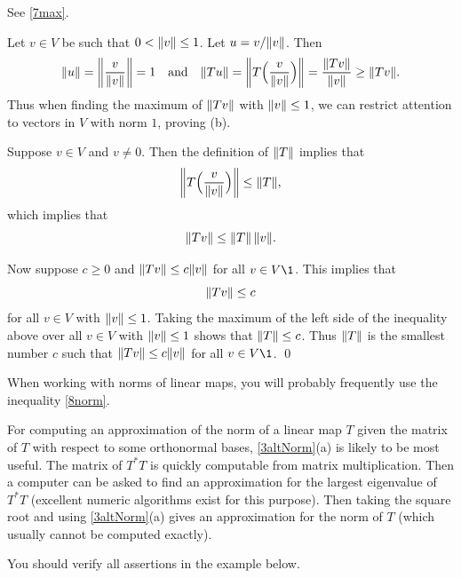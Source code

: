 \proof
\begin{subtheorem}
\item
See \ref{7max}.

\item
Let $v \in V$ be such that $0 < \lVert v\rVert \le 1$. Let $u = v/\lVert v\rVert$. Then
\[
\norm{u} = \norm[\bigg]{ \frac{v}{\norm{v}} } = 1 \andd \norm{Tu} =\norm[\bigg]{ T\paren[\Big]{ \frac{v}{\norm{v}} } } = \frac{\norm{Tv}}{\norm{v}} \ge \norm{Tv}.
\]
Thus when finding the maximum of $\lVert Tv\rVert$ with $\lVert v\rVert \le 1$, we can restrict attention to vectors in $V$ with norm $1$,
proving (b).

\item
Suppose $v \in V$ and $v \ne 0$. Then the definition of $\lVert T\rVert$ implies that
\[
\norm[\bigg]{ T\paren[\Big]{ \frac{v}{\norm{v}} } } \le \norm{T},
\]
which implies that
\begin{equation} \label{8norm}
\lVert Tv\rVert \le \lVert T\rVert \, \lVert v\rVert.
\end{equation}

Now suppose $c \ge 0$ and $\lVert Tv\rVert \le c \lVert v\rVert$ for all $v \in V\1$.
This implies that
\[
\lVert Tv\rVert \le c
\]
for all $v\in V$ with $\lVert v\rVert \le 1$. Taking the maximum of the left side of the inequality above over all $v \in V$ with $\lVert v\rVert \le 1$ shows that $\lVert T\rVert \le c$.
Thus $\lVert T\rVert$ is the smallest number $c$ such that $\lVert Tv\rVert \le c \lVert v\rVert$ for all $v \in V\1$.
\qed
\end{subtheorem}

When working with norms of linear maps, you will probably frequently use the inequality \ref{8norm}.

For computing an approximation of the norm of a linear map $T$  given the matrix of $T$ with respect to some orthonormal bases, \ref{3altNorm}(a) is likely to be most useful. The matrix of $T^*T$ is quickly computable from matrix multiplication. Then a computer can be asked to find an approximation for the largest eigenvalue of $T^*T$ (excellent numeric algorithms exist for this purpose). Then taking the square root and using \ref{3altNorm}(a) gives an approximation for the norm of $T$ (which usually cannot be computed exactly).

\pagebreak[3]

You should verify all assertions in the example below.

